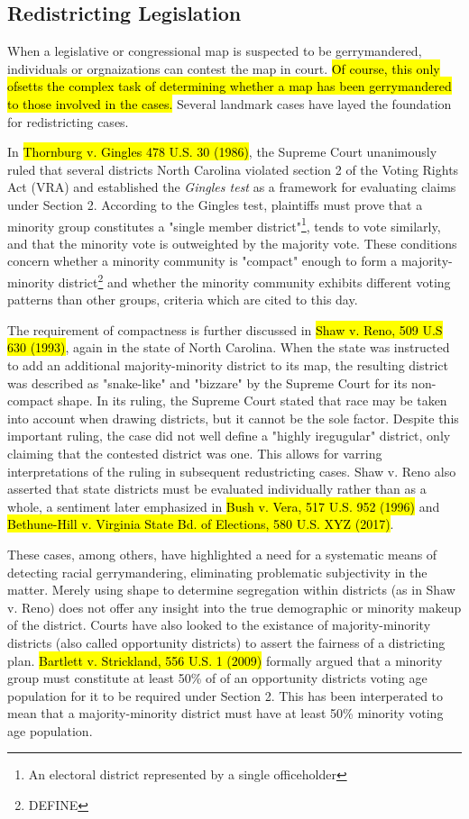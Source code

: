 \documentclass{article}
\begin{document}
\subsection{Redistricting Legislation} \label{legislation}
When a legislative or congressional map is suspected to be gerrymandered, individuals or orgnaizations can contest the map in court. \hl{Of course, this only ofsetts the complex task of determining whether a map has been gerrymandered to those involved in the cases.} Several landmark cases have layed the foundation for redistricting cases. 
\par
In \hl{Thornburg v. Gingles 478 U.S. 30 (1986)}, the Supreme Court unanimously ruled that several districts North Carolina violated section 2 of the Voting Rights Act (VRA) and established the \emph{Gingles test} as a framework for evaluating claims under Section 2. According to the Gingles test, plaintiffs must prove that a minority group constitutes a "single member district"\footnote{An electoral district represented by a single officeholder }, tends to vote similarly, and that the minority vote is outweighted by the majority vote. These conditions concern whether a minority community is "compact" enough to form a majority-minority district\footnote{DEFINE} and whether the minority community exhibits different voting patterns than other groups, criteria which are cited to this day.
\par 
The requirement of compactness is further discussed in \hl{Shaw v. Reno, 509 U.S 630 (1993)}, again in the state of North Carolina. When the state was instructed to add an additional majority-minority district to its map, the resulting district was described as "snake-like"  and "bizzare" by the Supreme Court for its non-compact shape. In its ruling, the Supreme Court stated that race may be taken into account when drawing districts, but it cannot be the sole factor. Despite this important ruling, the case did not well define a "highly iregugular" district, only claiming that the contested district was one. This allows for varring interpretations of the ruling in subsequent redustricting cases. Shaw v. Reno also asserted that state districts must be evaluated individually rather than as a whole, a sentiment later emphasized in \hl{Bush v. Vera, 517 U.S. 952 (1996)} and \hl{Bethune-Hill v. Virginia State Bd. of Elections, 580 U.S. XYZ (2017)}.
\par
These cases, among others, have highlighted a need for a systematic means of detecting racial gerrymandering, eliminating problematic subjectivity in the matter. Merely using shape to determine segregation within districts (as in Shaw v. Reno) does not offer any insight into the true demographic or minority makeup of the district. Courts have also looked to the existance of majority-minority districts (also called opportunity districts) to assert the fairness of a districting plan. \hl{Bartlett v. Strickland, 556 U.S. 1 (2009)} formally argued that a minority group must constitute at least 50\% of of an opportunity districts voting age population for it to be required under Section 2. This has been interperated to mean that a majority-minority district must have at least 50\% minority voting age population. 
\end{document}
